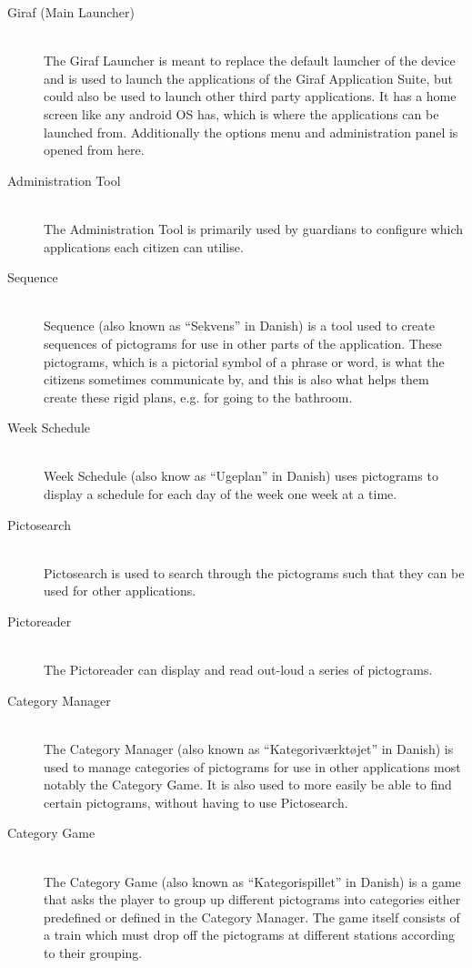 \begin{description}
	\item[Giraf (Main Launcher)]\hfill \\
	The Giraf Launcher is meant to replace the default launcher of the device and is used to launch the applications of the Giraf Application Suite, but could also be used to launch other third party applications.
	It has a home screen like any android OS has, which is where the applications can be launched from.
	Additionally the options menu and administration panel is opened from here.
	\item[Administration Tool]\hfill \\
	The Administration Tool is primarily used by guardians to configure which applications each citizen can utilise.
	\item[Sequence] \hfill \\
	Sequence (also known as ``Sekvens'' in Danish) is a tool used to create sequences of pictograms for use in other parts of the application.
	These pictograms, which is a pictorial symbol of a phrase or word, is what the citizens sometimes communicate by, and this is also what helps them create these rigid plans, e.g. for going to the bathroom.
	\item[Week Schedule] \hfill \\
	Week Schedule (also know as ``Ugeplan'' in Danish) uses pictograms to display a schedule for each day of the week one week at a time.
	\item[Pictosearch] \hfill \\
	Pictosearch is used to search through the pictograms such that they can be used for other applications.
	\item[Pictoreader] \hfill \\
	The Pictoreader can display and read out-loud a series of pictograms.
	\item[Category Manager] \hfill \\
	The Category Manager (also known as ``Kategoriværktøjet'' in Danish) is used to manage categories of pictograms for use in other applications most notably the Category Game.
	It is also used to more easily be able to find certain pictograms, without having to use Pictosearch.
	\item[Category Game] \hfill \\
	The Category Game (also known as ``Kategorispillet'' in Danish) is a game that asks the player to group up different pictograms into categories either predefined or defined in the Category Manager.
	The game itself consists of a train which must drop off the pictograms at different stations according to their grouping.

\end{description}
